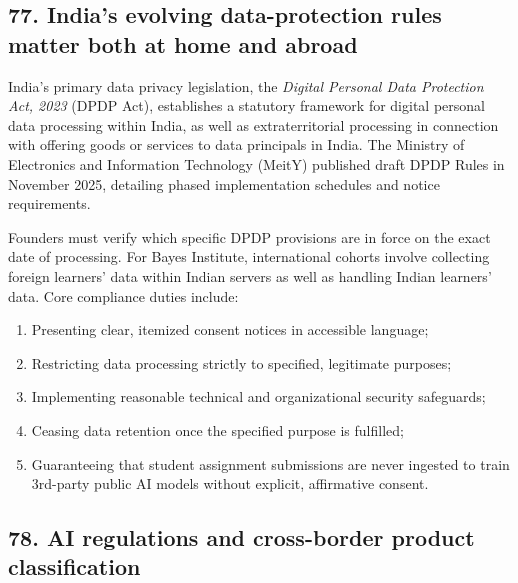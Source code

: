 \subsection{77. India's evolving data-protection rules matter both at home and abroad}

India's primary data privacy legislation, the \textit{Digital Personal Data Protection Act, 2023} (DPDP Act), establishes a statutory framework for digital personal data processing within India, as well as extraterritorial processing in connection with offering goods or services to data principals in India. The Ministry of Electronics and Information Technology (MeitY) published draft DPDP Rules in November 2025, detailing phased implementation schedules and notice requirements.

Founders must verify which specific DPDP provisions are in force on the exact date of processing. For Bayes Institute, international cohorts involve collecting foreign learners' data within Indian servers as well as handling Indian learners' data. Core compliance duties include:
\begin{enumerate}
    \item Presenting clear, itemized consent notices in accessible language;
    \item Restricting data processing strictly to specified, legitimate purposes;
    \item Implementing reasonable technical and organizational security safeguards;
    \item Ceasing data retention once the specified purpose is fulfilled;
    \item Guaranteeing that student assignment submissions are never ingested to train 3rd-party public AI models without explicit, affirmative consent.
\end{enumerate}

\subsection{78. AI regulations and cross-border product classification}

